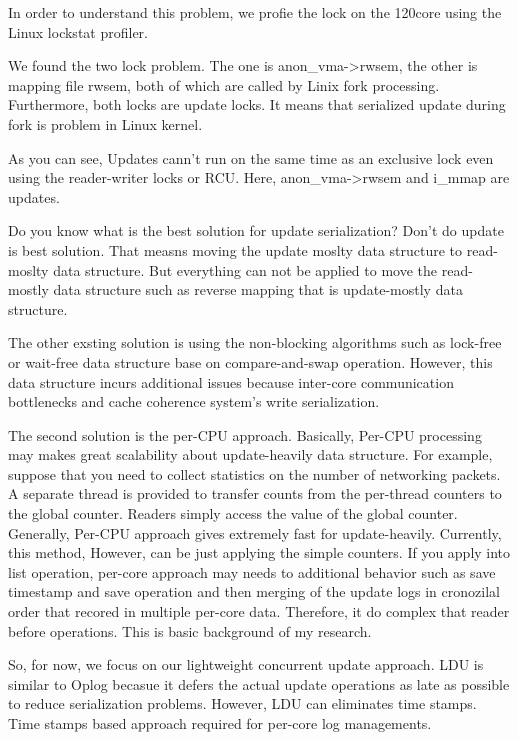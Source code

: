 In order to understand this problem, we profie the lock on the 120core using the
Linux lockstat profiler.

We found the two lock problem. The one is anon_vma->rwsem, the other is mapping
file rwsem, both of which are called by Linix fork processing.
Furthermore, both locks are update locks.
It means that serialized update during fork is problem in Linux kernel.

As you can see, Updates cann't run on the same time as an exclusive lock even
using the reader-writer locks or RCU.
Here, anon_vma->rwsem and i_mmap are updates.

Do you know what is the best solution for update serialization?
Don't do update is best solution.
That measns moving the update moslty data structure to read-moslty data
structure.
But everything can not be applied to move the read-mostly data structure 
such as reverse mapping that is update-mostly data structure.

The other exsting solution is using the non-blocking algorithms such as
lock-free or wait-free data structure base on compare-and-swap operation.
However, this data structure incurs additional issues because
inter-core communication bottlenecks and cache coherence system's write
serialization.

The second solution is the per-CPU approach.
Basically, Per-CPU processing may makes great scalability about update-heavily
data structure.
For example, suppose that you need to collect statistics on the number of
networking packets.
A separate thread is provided to transfer counts from the per-thread counters
to the global counter.
Readers simply access the value of the global counter.
Generally, Per-CPU approach gives extremely fast for update-heavily.
Currently, this method, However, can be just applying the simple counters.
If you apply into list operation, per-core approach may needs to additional
behavior such as save timestamp and save operation and then merging of the
update logs in cronozilal order that recored in multiple per-core data. 
Therefore, it do complex that reader before operations. 
This is basic background of my research.

So, for now, we focus on our lightweight concurrent update approach.
LDU is similar to Oplog becasue it defers the actual update operations as late
as possible to reduce serialization problems.
However, LDU can eliminates time stamps.
Time stamps based approach required for per-core log
managements.

